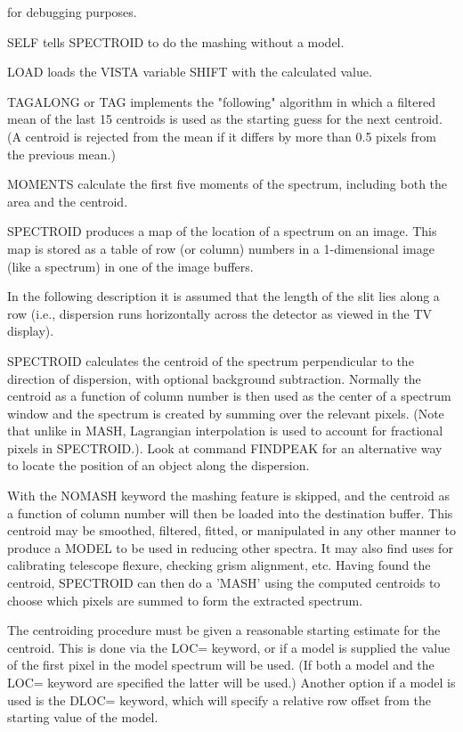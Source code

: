 \begin{command}
{       for debugging purposes.}
  \item[SELF]{tells SPECTROID to do the mashing without a model.}
  \item[LOAD]{loads the VISTA variable SHIFT with the calculated value.}
  \item[TAGALONG or TAG]{implements the "following" algorithm in which a
       filtered mean of the last 15 centroids is used as the starting guess
       for the next centroid.  (A centroid is rejected from the mean if it
       differs by more than 0.5 pixels from the previous mean.)}
  \item[MOMENTS]{calculate the first five moments of the spectrum,
       including both the area and the centroid.}
\end{command}

SPECTROID produces a map of the location of a spectrum on an image.  This
map is stored as a table of row (or column) numbers in a 1-dimensional
image (like a spectrum) in one of the image buffers.

In the following description it is assumed that the length of the slit lies
along a row (i.e., dispersion runs horizontally across the detector as
viewed in the TV display).

SPECTROID calculates the centroid of the spectrum perpendicular to the
direction of dispersion, with optional background subtraction.  Normally
the centroid as a function of column number is then used as the center of a
spectrum window and the spectrum is created by summing over the relevant
pixels.  (Note that unlike in MASH, Lagrangian interpolation is used to
account for fractional pixels in SPECTROID.). Look at command FINDPEAK for
an alternative way to locate the position of an object along the
dispersion.

With the NOMASH keyword the mashing feature is skipped, and the centroid as
a function of column number will then be loaded into the destination
buffer.  This centroid may be smoothed, filtered, fitted, or manipulated in
any other manner to produce a MODEL to be used in reducing other spectra.
It may also find uses for calibrating telescope flexure, checking grism
alignment, etc. Having found the centroid, SPECTROID can then do a 'MASH'
using the computed centroids to choose which pixels are summed to form the
extracted spectrum.

The centroiding procedure must be given a reasonable starting estimate for
the centroid.  This is done via the LOC= keyword, or if a model is supplied
the value of the first pixel in the model spectrum will be used.  (If both
a model and the LOC= keyword are specified the latter will be used.)
Another option if a model is used is the DLOC= keyword, which will specify
a relative row offset from the starting value of the model.

